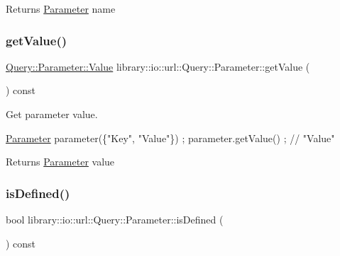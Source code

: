 \begin{DoxyReturn}{Returns}
\hyperlink{classlibrary_1_1io_1_1url_1_1_query_1_1_parameter}{Parameter} name 
\end{DoxyReturn}
\mbox{\label{classlibrary_1_1io_1_1url_1_1_query_1_1_parameter_a9726265cd0f0e84500e65937d5bcd740}} 
\subsubsection{\texorpdfstring{get\+Value()}{getValue()}}
{\footnotesize\ttfamily \hyperlink{classlibrary_1_1io_1_1url_1_1_query_1_1_parameter_a46e7a7b97d44f51f83d6261f70ba0a5e}{Query\+::\+Parameter\+::\+Value} library\+::io\+::url\+::\+Query\+::\+Parameter\+::get\+Value (\begin{DoxyParamCaption}{ }\end{DoxyParamCaption}) const}



Get parameter value. 


\begin{DoxyCode}
\hyperlink{classlibrary_1_1io_1_1url_1_1_query_1_1_parameter_ad6160646a07cb92213403426dbba4c64}{Parameter} parameter(\{\textcolor{stringliteral}{"Key"}, \textcolor{stringliteral}{"Value"}\}) ;
parameter.getValue() ; \textcolor{comment}{// "Value"}
\end{DoxyCode}


\begin{DoxyReturn}{Returns}
\hyperlink{classlibrary_1_1io_1_1url_1_1_query_1_1_parameter}{Parameter} value 
\end{DoxyReturn}
\mbox{\label{classlibrary_1_1io_1_1url_1_1_query_1_1_parameter_a48b88317b02fd9551578b6828fa43933}} 
\subsubsection{\texorpdfstring{is\+Defined()}{isDefined()}}
{\footnotesize\ttfamily bool library\+::io\+::url\+::\+Query\+::\+Parameter\+::is\+Defined (\begin{DoxyParamCaption}{ }\end{DoxyParamCaption}) const}



